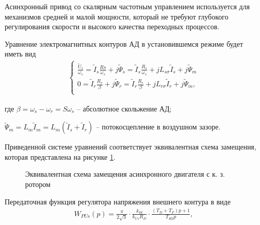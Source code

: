         Асинхронный привод со скалярным частотным управлением используется для
        механизмов средней и малой мощности, который не требуют глубокого
        регулирования скорости и высокого качества переходных процессов.

        Уравнение электромагнитных контуров АД в установившемся режиме будет
        иметь вид
        \begin{gather*}
            \left\{
            \begin{aligned}
                \frac{\tilde U_s}{\omega_s} =\tilde I_s\frac{Rs}{\omega_s}+
                    j\tilde \Psi_s=\tilde I_s\frac{R_s}{\omega_s}+
                        jL_{s\sigma}\tilde I_s +j\tilde \Psi_m\\
                0 = \tilde I_r\frac{R_r}{\beta}+j\tilde \Psi_r =
                    \tilde I_r\frac{R_r}{\beta}+jL_{r\sigma}\tilde I_r+
                        j \tilde \Psi_m,\\
            \end{aligned}
            \right.
        \end{gather*}

        где $\beta = \omega_s - \omega_r = S\omega_s$ -- абсолютное скольжение АД;\par
        $\tilde \Psi_m = L_m \tilde I_m = L_m(\tilde I_s + \tilde I_r)$ -- потокосцепление
        в воздушном зазоре.

        Приведенной системе уравнений соответствует эквивалентная схема
        замещения, которая представлена на рисунке \ref{fig:ad-zam}.  

        \begin{figure}[h!]
            \caption{Эквивалентная схема замещения асинхронного двигателя с к. з. ротором}
            \label{fig:ad-zam}
        \end{figure}

        Передаточная функция регулятора напряжения внешнего контура в виде
        \begin{gather*}
            W_{PUs}(p)=\frac{\pi}{2\sqrt{3}}\cdot\frac{k_{Id}}{k_{Us}R_D} \cdot
                \frac{(T_D + T_F) p+1}{T_{H2}p},
        \end{gather*}

